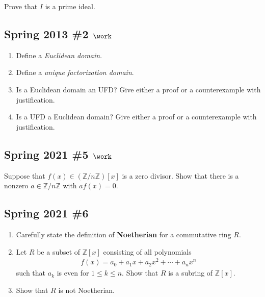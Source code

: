 Prove that \(I\) is a prime ideal.

\hypertarget{spring-2013-2-work}{%
\subsection{\texorpdfstring{Spring 2013 \#2
\(\work\)}{Spring 2013 \#2 \textbackslash work}}\label{spring-2013-2-work}}

\begin{enumerate}
\def\labelenumi{\alph{enumi}.}
\item
  Define a \emph{Euclidean domain}.
\item
  Define a \emph{unique factorization domain}.
\item
  Is a Euclidean domain an UFD? Give either a proof or a counterexample
  with justification.
\item
  Is a UFD a Euclidean domain? Give either a proof or a counterexample
  with justification.
\end{enumerate}

\hypertarget{spring-2021-5-work}{%
\subsection{\texorpdfstring{Spring 2021 \#5
\(\work\)}{Spring 2021 \#5 \textbackslash work}}\label{spring-2021-5-work}}

Suppose that \(f(x) \in ({\mathbb{Z}}/n{\mathbb{Z}})[x]\) is a zero
divisor. Show that there is a nonzero
\(a\in {\mathbb{Z}}/n{\mathbb{Z}}\) with \(af(x) = 0\).

\hypertarget{spring-2021-6}{%
\subsection{Spring 2021 \#6}\label{spring-2021-6}}

\begin{enumerate}
\def\labelenumi{\alph{enumi}.}
\item
  Carefully state the definition of \textbf{Noetherian} for a
  commutative ring \(R\).
\item
  Let \(R\) be a subset of \({\mathbb{Z}}[x]\) consisting of all
  polynomials
  \begin{align*}
  f(x) = a_ 0 + a_1 x + a_2 x^2 + \cdots + a_nx^n
  \end{align*}
  such that \(a_k\) is even for \(1\leq k \leq n\). Show that \(R\) is a
  subring of \({\mathbb{Z}}[x]\).
\item
  Show that \(R\) is not Noetherian.
\end{enumerate}

